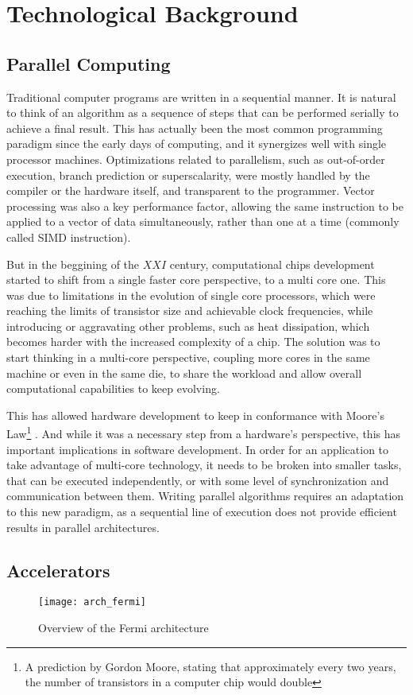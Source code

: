 \documentclass[main.tex]{subfiles}
\begin{document}
\section{Technological Background}

\subsection{Parallel Computing}

Traditional computer programs are written in a sequential manner. It is natural to think of an algorithm as a sequence of steps that can be performed serially to achieve a final result. This has actually been the most common programming paradigm since the early days of computing, and it synergizes well with single processor machines. Optimizations related to parallelism, such as out-of-order execution, branch prediction or superscalarity, were mostly handled by the compiler or the hardware itself, and transparent to the programmer. Vector processing was also a key performance factor, allowing the same instruction to be applied to a vector of data simultaneously, rather than one at a time (commonly called \ac{SIMD} instruction).

But in the beggining of the $XXI$ century, computational chips development started to shift from a single faster core perspective, to a multi core one. This was due to limitations in the evolution of single core processors, which were reaching the limits of transistor size and achievable clock frequencies, while introducing or aggravating other problems, such as heat dissipation, which becomes harder with the increased complexity of a chip. The solution was to start thinking in a multi-core perspective, coupling more cores in the same machine or even in the same die, to share the workload and allow overall computational capabilities to keep evolving.

This has allowed hardware development to keep in conformance with Moore's Law\footnote{A prediction by Gordon Moore, stating that approximately every two years, the number of transistors in a computer chip would double} . And while it was a necessary step from a hardware's perspective, this has important implications in software development. In order for an application to take advantage of multi-core technology, it needs to be broken into smaller tasks, that can be executed independently, or with some level of synchronization and communication between them. Writing parallel algorithms requires an adaptation to this new paradigm, as a sequential line of execution does not provide efficient results in parallel architectures.

\subsection{Accelerators}

\begin{figure}
  \centering
  \texttt{[image: arch\_fermi]}
  \caption{Overview of the Fermi architecture \label{fig:fermi}}
\end{figure}

\end{document}
